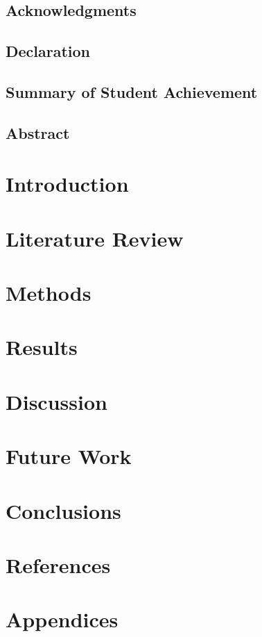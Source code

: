 \documentclass[12pt]{report}
\begin{document}

\restoregeometry

\section*{Acknowledgments}

\pagebreak

\section*{Declaration}

\pagebreak

\section*{Summary of Student Achievement}

\pagebreak

\setcounter{tocdepth}{5}
\tableofcontents
\pagebreak

\listoffigures
\listoftables
\pagebreak

\justify

\section*{Abstract}

\pagebreak
\printglossary

\chapter{Introduction}


\chapter{Literature Review}


\chapter{Methods}


\chapter{Results}


\chapter{Discussion}


\chapter{Future Work}


\chapter{Conclusions}




\chapter{References}
\label{sec:ref}

\chapter{Appendices}

\end{document}
